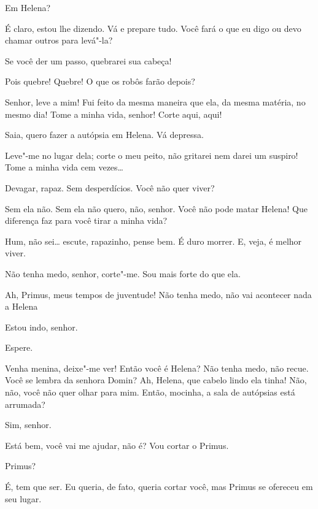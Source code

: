  Em Helena?

 É claro, estou lhe dizendo. Vá e prepare tudo. Você 
fará o que eu digo ou devo chamar outros para levá"-la?

  Se você der um passo, quebrarei sua
cabeça!

 Pois quebre! Quebre! O que os robôs farão depois?

  Senhor, leve a mim! Fui feito da mesma
maneira que ela, da mesma matéria, no mesmo dia! Tome a minha vida, senhor!
 Corte aqui, aqui!

 Saia, quero fazer a autópsia em Helena. Vá depressa.

 Leve"-me no lugar dela; corte o meu peito, não gritarei nem
darei um suspiro! Tome a minha vida cem vezes\ldots{}

 Devagar, rapaz. Sem desperdícios. Você não quer viver?

 Sem ela não. Sem ela não quero, não, senhor. Você não pode matar 
Helena! Que diferença faz para você tirar a minha vida?

  Hum, não sei\ldots{} escute,
rapazinho, pense bem. É duro morrer. E, veja, é melhor viver.

  Não tenha medo, senhor, corte"-me. Sou mais forte
do que ela.

  Ah, Primus, meus tempos de juventude! 
Não tenha medo, não vai acontecer nada a Helena

  Estou indo, senhor.

 Espere.

 Venha menina, deixe"-me ver! Então você é Helena?  Não tenha medo, não recue. Você se lembra da senhora Domin? Ah,
Helena, que cabelo lindo ela tinha! Não, não, você não quer olhar para mim.
Então, mocinha, a sala de autópsias está arrumada?

 Sim, senhor.

 Está bem, você vai me ajudar, não é? Vou cortar o Primus.

  Primus?

 É, tem que ser. Eu queria, de fato, queria cortar
você, mas Primus se ofereceu em seu lugar.

